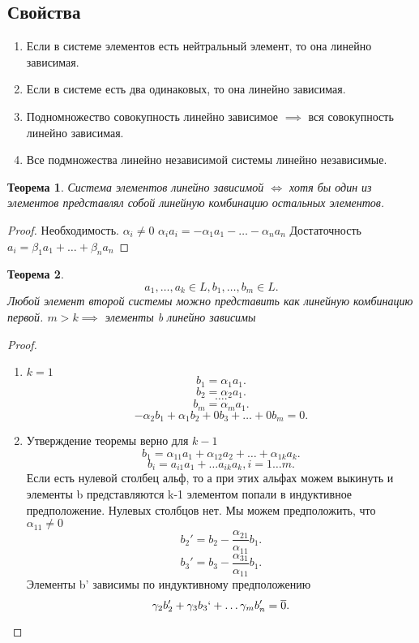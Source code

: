 \documentclass{scrartcl}
\newtheorem{theorem}{Теорема}
\begin{document}
\subsection{Свойства}
\begin{enumerate}
	\item Если в системе элементов есть нейтральный элемент, то она линейно зависимая.
	\item Если в системе есть два одинаковых, то она линейно зависимая.
	\item Подномножество совокупность линейно зависимое $\implies$ вся совокупность линейно зависимая.
	\item Все подмножества линейно независимой системы линейно независимые.
\end{enumerate}
\begin{theorem}
	Система элементов линейно зависимой $\iff$ хотя бы один из элементов представлял собой линейную комбинацию остальных элементов.
\end{theorem}
\begin{proof}
	Необходимость. $\alpha_{i} \neq 0$ $\alpha_{i}a_{i} = -\alpha_1 a_{1} - \dots - \alpha_{n} a_{n}$
	Достаточность $a_{i} = \beta_1 a_{1} + \dots + \beta_{n} a_{n}$
\end{proof}
\begin{theorem}
	\[
		a_1,\dots,a_{k} \in L, b_1,\dots,b_{m} \in L
		.\]
	Любой элемент второй системы можно представить как линейную комбинацию первой.
	$m > k \implies $ элементы b линейно зависимы
\end{theorem}
\begin{proof}
	\begin{enumerate}
		\item $k = 1$
		      \[
			      b_1 = \alpha_{1} a_{1}
			      .\]
		      \[
			      b_2 = \alpha_{2}a_1
			      .\]
		      \[
			      \dots
			      .\]
		      \[
			      b_{m} = \alpha_{m} a_1
			      .\]
		      \[
			      -\alpha_2 b_1 + \alpha_1 b_2 + 0b_3 + \dots + 0 b_{m} = 0
			      .\]
		\item
		      Утверждение теоремы верно для $k - 1$
		      \[
			      b_1 = \alpha_{11} a_1 + \alpha_{12} a_{2} + \dots + \alpha_{1k}a_{k}
			      .\]
		      \[
			      b_{i} = a_{i1}a_1 + \dots a_{ik}a_{k} , i = 1 \dots m
			      .\]
		      Если есть нулевой столбец альф, то а при этих альфах можем выкинуть и элементы b представляются k-1 элементом попали в индуктивное предположение. Нулевых столбцов нет. Мы можем предположить, что $\alpha_{11} \neq 0$
		      \[
			      b_{2}' =  b_2 - \frac{\alpha_{21}}{\alpha_{11}}b_1
			      .\]
		      \[
			      b_3' = b_3  - \frac{\alpha_{31}}{\alpha_{11}}b_1
			      .\]
		      Элементы b' зависимы по индуктивному предположению
		      \[
			      \gamma_2 b_2' + \gamma_3 b_3` + \dots \gamma_{m}b_{n}' = \overline{0}
			      .\]
	\end{enumerate}
\end{proof}
\end{document}
